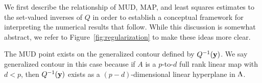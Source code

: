 


We first describe the relationship of MUD, MAP, and least squares estimates to the set-valued inverses of $Q$ in order to establish a conceptual framework for interpreting the numerical results that follow.
While this discussion is somewhat abstract, we refer to Figure~\ref{fig:regularization} to make these ideas more clear.

The MUD point exists on the generalized contour defined by $Q^{-1}(\mathbf{y})$.
We say generalized contour in this case because if $A$ is a $p$-to-$d$ full rank linear map with $d<p$, then $Q^{-1}(\mathbf{y})$ exists as a $(p-d)$-dimensional linear hyperplane in ${\Lambda}$.

